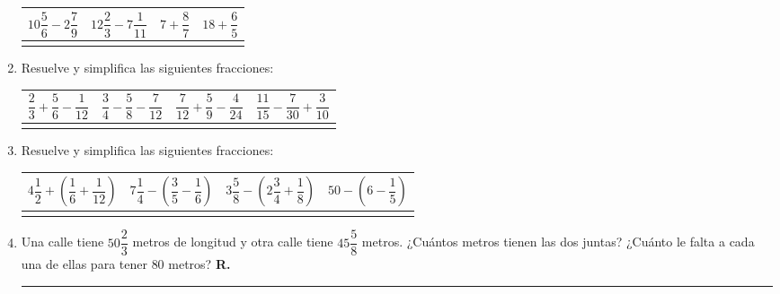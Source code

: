 \begin{enumerate}[label=\roman*)]
\begin{table}[H]
\begin{tabular}{ | c | c | c | c | }
\hline
$10 \dfrac{5}{6} - 2 \dfrac{7}{9}$ & $12 \dfrac{2}{3} - 7 \dfrac{1}{11}$ & $7 + \dfrac{8}{7}$ & $18 + \dfrac{6}{5}$ \\ \hline
 & & & \\ \hline  
\end{tabular}
\end{table}
\item  Resuelve y simplifica las siguientes fracciones:
\begin{table}[H]
\centering
\def\arraystretch{2}
\setlength{\tabcolsep}{18pt}
\begin{tabular}{ | c | c | c | c | } 
\hline
$\dfrac{2}{3} + \dfrac{5}{6} - \dfrac{1}{12}$ & $\dfrac{3}{4} - \dfrac{5}{8} - \dfrac{7}{12}$ & $\dfrac{7}{12} + \dfrac{5}{9} - \dfrac{4}{24}$ & $\dfrac{11}{15} - \dfrac{7}{30} + \dfrac{3}{10}$ \\ \hline
 & & & \\ \hline  
\end{tabular}
\end{table}
\item Resuelve y simplifica las siguientes fracciones:
\begin{table}[H]
\centering
\def\arraystretch{2}
\setlength{\tabcolsep}{15pt}
\begin{tabular}{ | c | c | c | c | } 
\hline
$4 \dfrac{1}{2} + \left( \dfrac{1}{6} + \dfrac{1}{12}\right)$ & $7 \dfrac{1}{4} - \left( \dfrac{3}{5} - \dfrac{1}{6}\right)$ & $3 \dfrac{5}{8} - \left( 2 \dfrac{3}{4} + \dfrac{1}{8} \right)$ & $50 - \left( 6 - \dfrac{1}{5} \right)$ \\ \hline
 & & & \\ \hline  
\end{tabular}
\end{table}
\item Una calle tiene $50 \dfrac{2}{3}$ metros de longitud y otra calle tiene $45 \dfrac{5}{8}$ metros. ¿Cuántos metros tienen las dos juntas? ¿Cuánto le falta a cada una de ellas para tener $80$ metros? \hspace{0.3cm} \textbf{R.} \rule{3cm}{0.1mm}
\end{enumerate}
